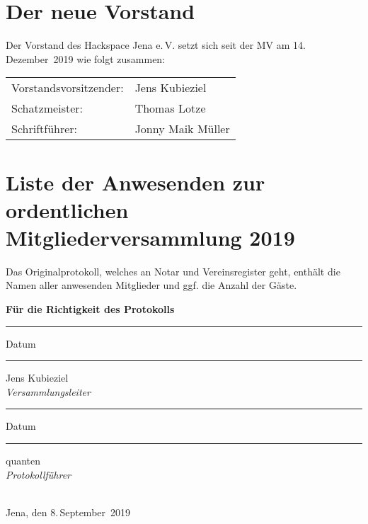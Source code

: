 \documentclass[DIV=calc,parksip=half*]{scrartcl}
\newcommand{\qbi}{Jens Kubieziel}
\newcommand{\jonny}{Jonny Maik Müller}
\newcommand{\thomas}{Thomas Lotze}
\newcommand{\quanten}{quanten}
\begin{document}

\clearpage{}
\section*{Der neue Vorstand}
Der Vorstand des Hackspace Jena e.\,V. setzt sich seit der MV am 14.\,De\-zem\-ber~2019
wie folgt zusammen:


\begin{tabularx}{.9\textwidth}{lX}
  Vorstandsvorsitzender: & \qbi{} \\
  Schatzmeister: & \thomas{} \\
  Schriftführer: & \jonny{}\\
\end{tabularx}

\section*{Liste der Anwesenden zur ordentlichen Mitgliederversammlung 2019}


Das Originalprotokoll, welches an Notar und Vereinsregister geht, enthält die
Namen aller anwesenden Mitglieder und ggf. die Anzahl der Gäste.


\vspace{10mm}
\textbf{\textsf{\large{Für die Richtigkeit des Protokolls}}} \\[2mm]
\hfill
\begin{minipage}[t]{20mm}
\vspace{22mm}
\hrule
\vspace{2mm}
\small{Datum}
\end{minipage}
\begin{minipage}[t]{40mm}
\vspace{22mm}
\hrule
\vspace{2mm}
\small{\qbi{}\\\textsl{Versammlungsleiter}}
\end{minipage}
\hfill
\begin{minipage}[t]{20mm}
\vspace{22mm}
\hrule
\vspace{2mm}
\small{Datum}
\end{minipage}
\begin{minipage}[t]{40mm}
\vspace{22mm}
\hrule
\vspace{2mm}
\small{\quanten{}\\\textsl{Protokollführer}}
\end{minipage}
\hfill
\\[8mm]
Jena, den 8.\,September~2019
\end{document}
